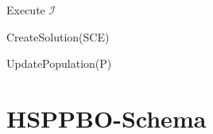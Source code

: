 \documentclass[fontsize=12, a4aper]{scrartcl}
\begin{document}
	\begin{algorithm}
		
		\caption{SPPBO}\label{sec:SPPBO_Schema:alg:SPPBO}
		
		\begin{algorithmic}[1]
			
			\State Execute \(\mathcal{I}\)
			
			\Repeat
			
				
					\State CreateSolution(SCE)
				
				\EndFor
				
				
					\State UpdatePopulation(P)
			
				\EndFor
				
				
		\end{algorithmic}
		
	\end{algorithm}
	
	\section{HSPPBO-Schema} \label{sec:HSPPBO_Schema}
	
\end{document}
